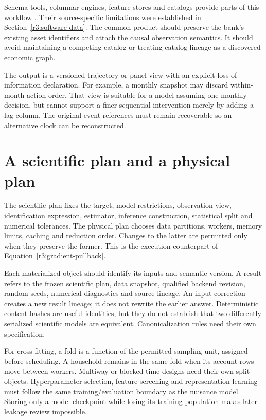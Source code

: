 Schema tools, columnar engines, feature stores and catalogs provide
parts of this workflow \citep{sw_duckdb,sw_polars,sw_pandera,sw_feast,
sw_datahub,sw_openmetadata,sw_splink}. Their source-specific limitations
were established in Section~\ref{r3:software-data}. The common product
should preserve the bank's existing asset identifiers and attach the
causal observation semantics. It should avoid maintaining a competing
catalog or treating catalog lineage as a discovered economic graph.

The output is a versioned trajectory or panel view with an explicit
loss-of-information declaration. For example, a monthly snapshot may
discard within-month action order. That view is suitable for a model
assuming one monthly decision, but cannot support a finer sequential
intervention merely by adding a lag column. The original event references
must remain recoverable so an alternative clock can be reconstructed.

\section{A scientific plan and a physical plan}
\label{r3:execution-plan}

The scientific plan fixes the target, model restrictions, observation
view, identification expression, estimator, inference construction,
statistical split and numerical tolerances. The physical plan chooses
data partitions, workers, memory limits, caching and reduction order.
Changes to the latter are permitted only when they preserve the former.
This is the execution counterpart of Equation~\eqref{r3:gradient-pullback}.

Each materialized object should identify its inputs and semantic version.
A result refers to the frozen scientific plan, data snapshot, qualified
backend revision, random seeds, numerical diagnostics and source lineage.
An input correction creates a new result lineage; it does not rewrite the
earlier answer. Deterministic content hashes are useful identities, but
they do not establish that two differently serialized scientific models
are equivalent. Canonicalization rules need their own specification.

For cross-fitting, a fold is a function of the permitted sampling unit,
assigned before scheduling. A household remains in the same fold when
its account rows move between workers. Multiway or blocked-time designs
need their own split objects. Hyperparameter selection, feature screening
and representation learning must follow the same training/evaluation
boundary as the nuisance model. Storing only a model checkpoint while
losing its training population makes later leakage review impossible.

